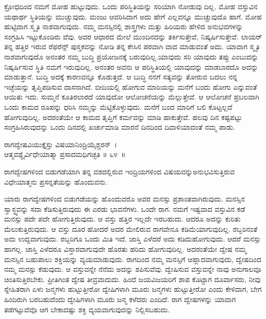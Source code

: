 ಕ್ರೋಧದಿಂದ ನಮಗೆ ಮೋಹ ಹುಟ್ಟುವುದು. ಒಂದು ಪರಿಸ್ಥಿತಿಯನ್ನು ಸರಿಯಾಗಿ ನೋಡುವು ದಿಲ್ಲ. ಮೋಹ ವಸ್ತುವಿನ ಯಥಾರ್ಥ ಸ್ಥಿತಿಯನ್ನು ಮುಚ್ಚುವುದು. ಮಂಜು ಆವರಿಸಿದಾಗ ಅದು ಹೇಗೆ ಎಲ್ಲವನ್ನೂ ಮುಚ್ಚುವುದೊ ಹಾಗೆ. ಮೋಹ ಹುಟ್ಟಿದಾಗ ಸ್ಮೃತಿ ನಾಶವಾಗುವುದು. ನಮ್ಮ ಮನಸ್ಸಿನಲ್ಲಿ ಶಾಸ್ತ್ರಗಳು ಮತ್ತು ಹಿರಿಯರು ಹೇಳಿದ ಅನುಭವಗಳನ್ನು ಸಂಗ್ರಹಿಸಿ ಇಟ್ಟುಕೊಂಡಿರು ವೆವು. ಅದರ ಆಧಾರದ ಮೇಲೆ ಮುಂದಿನದನ್ನು ತರ್ಕಿಸುತ್ತೇವೆ, ನಿಷ್ಕರ್ಷಿಸುತ್ತೇವೆ. ಲಾಯರ್ ತನ್ನ ಹತ್ತಿರ ಇರುವ ರೆಫರೆನ್ಸ್ ಪುಸ್ತಕವನ್ನು ನೋಡಿ ತನ್ನ ಕೇಸಿನ ಪರವಾಗಿ ವಾದ ಮಾಡುವಂತೆ ಅದು. ಯಾವಾಗ ಸ್ಮೃತಿ ನಾಶವಾಗುವುದೊ ಅನಂತರ ನಮ್ಮ ಬುದ್ಧಿ ಪ್ರಯೋಜನಕ್ಕೆ ಬರುವುದಿಲ್ಲ.\break ಯಾವುದು ಸರಿ ಯಾವುದು ತಪ್ಪು ಎಂಬುದನ್ನು ನಿಷ್ಕರ್ಷಿಸುವ ಸ್ಥಿತಿ ನಮಗೆ ಇರುವುದಿಲ್ಲ. ಅನಂತರ ಅವನು ಆ ಪರಿಸ್ಥಿತಿಯಲ್ಲಿ ಯಾವುದನ್ನು ಮಾಡಬಾರದೊ ಅದನ್ನು ಮಾಡುತ್ತಾನೆ. ಬುದ್ಧಿ ಅದಕ್ಕೆ ಕಾರಣವನ್ನೂ ಕೊಡುತ್ತದೆ. ಆ ಬುದ್ಧಿ ನನಗೆ ಸತ್ಯವನ್ನು ತೋರುವ ಬದಲು ನನ್ನ ಇಚ್ಛೆಯನ್ನು ತೃಪ್ತಿಪಡಿಸುವ ದಾಸನಾಗಿದೆ. ಬೀದಿಯಲ್ಲಿ ಹೋಗುವ ಮಾರಿಯನ್ನು ಮನೆಗೆ ಬಂದು ಹೋಗು ಎನ್ನುವಂತೆ ಆಯಿತು ಇದು. ಸುಮ್ಮನೆ ಕೂತಿರಲಾರದೆ ಯಾವುದೋ ಆಲೋಚನೆಯನ್ನು ಮೆಲ್ಲುತ್ತೇವೆ. ಆ ಆಲೋಚನೆ ಪ್ರಬಲವಾಗಿ ಒಂದು ಕಾಮದ ರೂಪನ್ನು ಧರಿಸಿ ನಮ್ಮನ್ನು ಮೆಟ್ಟಿಕೊಳ್ಳುವುದು. ಮನೆಗೆ ಬಂದ ಮಾರಿಗೆ ಬಲಿ ಕೊಟ್ಟಲ್ಲದೆ ಹೋಗುವುದಿಲ್ಲ. ಅದರಂತೆಯೇ ಆ ಕಾಮದ ತೃಪ್ತಿಗೆ ಕರ್ಮವನ್ನು ಮಾಡಿ ಹಾಕುತ್ತೇವೆ. ಹಲವು ದಿನ ಕಷ್ಟಪಟ್ಟು ಸಂಗ್ರಹಿಸಿರುವುದನ್ನು ಒಂದು ದಿನದಲ್ಲಿ ಖರ್ಚುಮಾಡಿ ಮಾರನೆ ದಿನದಿಂದ ದಿವಾಳಿಯಾದಂತೆ ನಮ್ಮ ಪಾಡು.

\begin{shloka}
ರಾಗದ್ವೇಷವಿಯುಕ್ತೈಸ್ತು ವಿಷಯಾನಿಂದ್ರಿಯೈಶ್ಚರನ್~।\\ಆತ್ಮವಶ್ಯೈರ್ವಿಧೇಯಾತ್ಮಾ ಪ್ರಸಾದಮಧಿಗಚ್ಛತಿ \hfill॥ ೬೪~॥
\end{shloka}

\begin{artha}
ರಾಗದ್ವೇಷಗಳಿಂದ ಬಿಡುಗಡೆಯಾಗಿ ತನ್ನ ವಶದಲ್ಲಿರುವ ಇಂದ್ರಿಯಗಳಿಂದ ವಿಷಯವನ್ನು\break ಅನುಭವಿಸುತ್ತಿರುವ ವಿಧೇಯಾತ್ಮನು ಪ್ರಸನ್ನತೆಯನ್ನು ಹೊಂದುವನು.
\end{artha}

ಯಾರು ರಾಗದ್ವೇಷಗಳಿಂದ ಬಿಡುಗಡೆಯನ್ನು ಹೊಂದುವರೊ ಅವರ ಮನಸ್ಸು ಪ್ರಶಾಂತ\-ವಾಗಿರುವುದು. ಮನಸ್ಸಿನ ಸ್ವಾಸ್ಥ್ಯವನ್ನು ಸದಾ ಕೆಡಿಸುತ್ತಿರುವುದು ಈ ಎರಡು ಭಾವನೆಗಳು. ಒಂದೇ ರಾಗ. ನಮಗೆ ಇಷ್ಟವಾದ ವಸ್ತುವಿನ ಕಡೆ ಮನಸ್ಸು ಪದೇ ಪದೇ ಹೋಗುತ್ತಿರುವುದು. ಆ ವಸ್ತು ಹತ್ತಿರ ಇಲ್ಲದೇ ಇರಬಹುದು. ಆದರೂ ಅದನ್ನು ಕುರಿತು ಮೆಲುಕುತ್ತಿರುವುದು. ಆ ವಸ್ತು ದೂರ ಹೋದರೆ ಅದರ ಮೇಲಿರುವ ರಾಗವೇನೂ ಕಡಿಮೆಯಾಗುವುದಿಲ್ಲ. ರಬ್ಬರಿನಂತೆ ಅದು ಉದ್ದವಾಗುವುದು. ರಬ್ಬರಿಗೂ ಒಂದು ಮಿತಿ ಇದೆ. ಜಾಸ್ತಿ ಎಳೆದರೆ ಅದು ಕಡಿದುಹೋಗುವುದು. ಆದರೆ ಮನಸ್ಸು ಹಾಗಲ್ಲ. ಜಾಸ್ತಿ ಎಳೆದರೂ ವಿಸ್ತಾರವಾಗುವುದೇ ಹೊರತು ಹರಿದು ಹೋಗುವುದಿಲ್ಲ. ಅದರಂತೆಯೇ ದ್ವೇಷ ನಮ್ಮ ಮನಸ್ಸಿನ ಬಹುಪಾಲು ಶಕ್ತಿಯನ್ನು ವ್ಯಯಮಾಡುವುದು. ರಾಗದಿಂದ ನಮ್ಮ ಮನಸ್ಸಿಗೆ ಆಹ್ಲಾದವಾಗುವುದು, ದ್ವೇಷದಿಂದ ನಮ್ಮ ಮನಸ್ಸು ಕೆಡುವುದು. ಆ ವಸ್ತುವನ್ನೇ ನೆನೆದು ಅದನ್ನು ಶಪಿಸುವೆವು. ದ್ವೇಷಿಸುವ ವಸ್ತುವನ್ನೇ ನಾವು ಅನುಗಾಲವೂ ಚಿಂತಿಸುತ್ತಿರಬೇಕು. ಪ್ರೀತಿಗಿಂತ ದ್ವೇಷ ತೀವ್ರವಾದುದು. ಹಿಂದೆ ಜಯವಿಜಯರಿಗೆ ಶಾಪ ಕೊಟ್ಟಾಗ ದೂರ್ವಾಸರು, ನೀವು ಸ್ನೇಹಿತರಾಗಿ ಏಳು ಜನ್ಮಗಳು ಹುಟ್ಟುತ್ತೀರೋ ದ್ವೇಷಿಗಳಾಗಿ ಮೂರು ಜನ್ಮಗಳು ಹುಟ್ಟುತ್ತೀರೋ ಎಂದು ಕೇಳಿದಾಗ, ಬೇಗ ಹಿಂದಿರುಗಿ ಬರಬಹುದೆಂದು ದ್ವೇಷಿಗಳಾಗಿ ಮೂರು ಜನ್ಮ ಕಳೆದರು ಎಂದಿದೆ. ರಾಗ ದ್ವೇಷಗಳನ್ನು ಯಾವಾಗ ತಡೆಗಟ್ಟುವೆವೊ ಆಗ ಬೇಕಾದಷ್ಟು ಶಕ್ತಿ ವ್ಯಯವಾಗುವುದನ್ನು ನಿಲ್ಲಿಸಬಹುದು.

